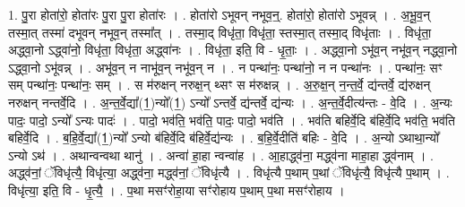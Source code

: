\documentclass[17pt]{extarticle}
\begin{document}
1. पु॒रा होता॑रो॒ होता॑रः पु॒रा पु॒रा होता॑रः । . होता॑रो ऽभूवन् नभूव॒न्॒. होता॑रो॒ होता॑रो ऽभूवन्न् । . अ॒भू॒व॒न् तस्मा॒त् तस्मा॑ दभूवन् नभूव॒न् तस्मा᳚त् । . तस्मा॒द् विधृ॑ता॒ विधृ॑ता॒ स्तस्मा॒त् तस्मा॒द् विधृ॑ताः । . विधृ॑ता॒ अद्ध्वा॒नो ऽद्ध्वा॑नो॒ विधृ॑ता॒ विधृ॑ता॒ अद्ध्वा॑नः । . विधृ॑ता॒ इति॒ वि - धृ॒ताः॒ । . अद्ध्वा॒नो ऽभू॑व॒न् नभू॑व॒न् नद्ध्वा॒नो ऽद्ध्वा॒नो ऽभू॑वन्न् । . अभू॑व॒न् न नाभू॑व॒न् नभू॑व॒न् न । . न पन्था॑नः॒ पन्था॑नो॒ न न पन्था॑नः । . पन्था॑नः॒ सꣳ सम् पन्था॑नः॒ पन्था॑नः॒ सम् । . स म॑रुक्षन् नरुक्ष॒न् थ्सꣳ स म॑रुक्षन्न् । . अ॒रु॒क्ष॒न् न॒न्त॒र्वे॒ द्य॑न्तर्वे॒ द्य॑रुक्षन् नरुक्षन् नन्तर्वे॒दि । . अ॒न्त॒र्वे॒द्या᳚(1॒)न्यो᳚(1॒) ऽन्यो᳚ ऽन्तर्वे॒ द्य॑न्तर्वे॒ द्य॑न्यः । . अ॒न्त॒र्वे॒दीत्य॑न्तः - वे॒दि । . अ॒न्यः पादः॒ पादो॒ ऽन्यो᳚ ऽन्यः पादः॑ । . पादो॒ भव॑ति॒ भव॑ति॒ पादः॒ पादो॒ भव॑ति । . भव॑ति बहिर्वे॒दि ब॑हिर्वे॒दि भव॑ति॒ भव॑ति बहिर्वे॒दि । . ब॒हि॒र्वे॒द्या᳚(1॒)न्यो᳚ ऽन्यो ब॑हिर्वे॒दि ब॑हिर्वे॒द्य॑न्यः । . ब॒हि॒र्वे॒दीति॑ बहिः - वे॒दि । . अ॒न्यो ऽथाथा॒न्यो᳚ ऽन्यो ऽथ॑ । . अथान्वन्वथा थानु॑ । . अन्वा॑ हा॒हा न्वन्वा॑ह । . आ॒हाद्ध्व॑ना॒ मद्ध्व॑ना माहा॒हा द्ध्व॑नाम् । . अद्ध्व॑नां॒ ॅविधृ॑त्यै॒ विधृ॑त्या॒ अद्ध्व॑ना॒ मद्ध्व॑नां॒ ॅविधृ॑त्यै । . विधृ॑त्यै प॒थाम् प॒थां ॅविधृ॑त्यै॒ विधृ॑त्यै प॒थाम् । . विधृ॑त्या॒ इति॒ वि - धृ॒त्यै॒ । . प॒था मसꣳ॑रोहा॒या सꣳ॑रोहाय प॒थाम् प॒था मसꣳ॑रोहाय । \newline
\end{document}
